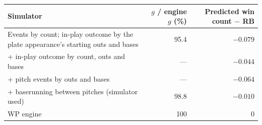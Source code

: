 \begin{tabular}{p{7.5cm}rr}
\toprule
Simulator & $g$ / engine $g$ (\%) & Predicted win count $-$ RB \\
\midrule
Events by count; in-play outcome by the plate appearance's starting outs and bases & 95.4 & $-0.079$ \\
+ in-play outcome by count, outs and bases & --- & $-0.044$ \\
+ pitch events by outs and bases & --- & $-0.064$ \\
+ baserunning between pitches (simulator used) & 98.8 & $-0.010$ \\
WP engine & 100 & $0$ \\
\bottomrule
\end{tabular}
